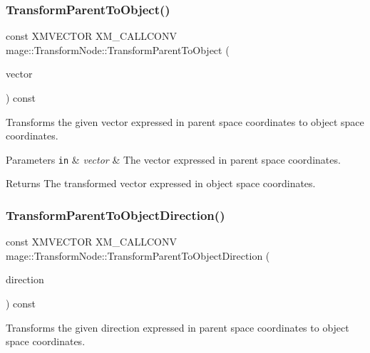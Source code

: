 \subsubsection{\texorpdfstring{Transform\+Parent\+To\+Object()}{TransformParentToObject()}}
{\footnotesize\ttfamily const X\+M\+V\+E\+C\+T\+OR X\+M\+\_\+\+C\+A\+L\+L\+C\+O\+NV mage\+::\+Transform\+Node\+::\+Transform\+Parent\+To\+Object (\begin{DoxyParamCaption}\item[{F\+X\+M\+V\+E\+C\+T\+OR}]{vector }\end{DoxyParamCaption}) const\hspace{0.3cm}{\ttfamily [noexcept]}}

Transforms the given vector expressed in parent space coordinates to object space coordinates.


\begin{DoxyParams}[1]{Parameters}
\mbox{\tt in}  & {\em vector} & The vector expressed in parent space coordinates. \\
\hline
\end{DoxyParams}
\begin{DoxyReturn}{Returns}
The transformed vector expressed in object space coordinates. 
\end{DoxyReturn}
\hypertarget{structmage_1_1_transform_node_ab7c1a1559d407f36deb342095b37e7b9}{}\label{structmage_1_1_transform_node_ab7c1a1559d407f36deb342095b37e7b9} 
\subsubsection{\texorpdfstring{Transform\+Parent\+To\+Object\+Direction()}{TransformParentToObjectDirection()}}
{\footnotesize\ttfamily const X\+M\+V\+E\+C\+T\+OR X\+M\+\_\+\+C\+A\+L\+L\+C\+O\+NV mage\+::\+Transform\+Node\+::\+Transform\+Parent\+To\+Object\+Direction (\begin{DoxyParamCaption}\item[{F\+X\+M\+V\+E\+C\+T\+OR}]{direction }\end{DoxyParamCaption}) const\hspace{0.3cm}{\ttfamily [noexcept]}}

Transforms the given direction expressed in parent space coordinates to object space coordinates.


